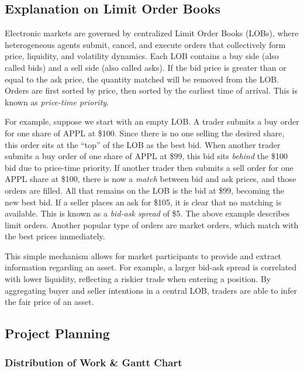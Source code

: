 \documentclass[12pt,a4paper]{article}
\begin{document}
\subsection{Explanation on Limit Order Books}\label{sec:lob_appendix}

Electronic markets are governed by centralized Limit Order Books (LOBs), where heterogeneous agents submit, cancel, and execute orders that collectively form price, liquidity, and volatility dynamics. Each LOB contains a buy side (also called bids) and a sell side (also called asks). If the bid price is greater than or equal to the ask price, the quantity matched will be removed from the LOB. Orders are first sorted by price, then sorted by the earliest time of arrival. This is known as \textit{price-time priority}.

For example, suppose we start with an empty LOB. A trader submits a buy order for one share of APPL at \$100. Since there is no one selling the desired share, this order sits at the ``top'' of the LOB as the best bid. When another trader submits a buy order of one share of APPL at \$99, this bid sits \textit{behind} the \$100 bid due to price-time priority. If another trader then submits a sell order for one APPL share at \$100, there is now a \textit{match} between bid and ask prices, and those orders are filled. All that remains on the LOB is the bid at \$99, becoming the new best bid. If a seller places an ask for \$105, it is clear that no matching is available. This is known as a \textit{bid-ask spread} of \$5. The above example describes limit orders. Another popular type of orders are market orders, which match with the best prices immediately.

This simple mechanism allows for market participants to provide and extract information regarding an asset. For example, a larger bid-ask spread is correlated with lower liquidity, reflecting a riskier trade when entering a position. By aggregating buyer and seller intentions in a central LOB, traders are able to infer the fair price of an asset.

\subsection{Project Planning}
\subsubsection{Distribution of Work \& Gantt Chart}
\end{document}

